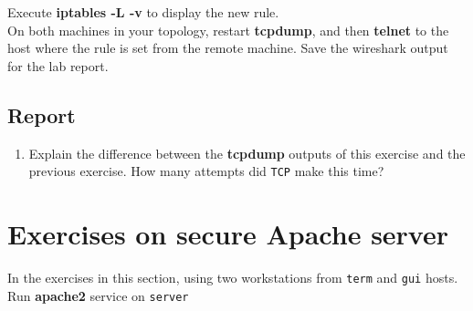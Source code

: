 \documentclass[10pt,a4paper]{article}
\numberwithin{equation}{section}
\numberwithin{figure}{section}
\numberwithin{table}{section}
\begin{document}
	Execute \textbf{iptables -L -v} to display the new rule.\\
	On both machines in your topology, restart \textbf{tcpdump}, and then \textbf{telnet} to the host where the rule is set from the remote machine. Save the wireshark output for the lab report.
	
	\subsection{Report}
	\begin{enumerate}
		\setlength{\itemindent}{0pt}
		\item Explain the difference between the \textbf{tcpdump} outputs of this exercise and the previous exercise. How many attempts did \texttt{TCP} make this time?
	\end{enumerate}

\section*{Exercises on secure Apache server}
	In the exercises in this section, using two workstations from \texttt{term} and \texttt{gui} hosts. Run \textbf{apache2} service on \texttt{server}
\end{document}
